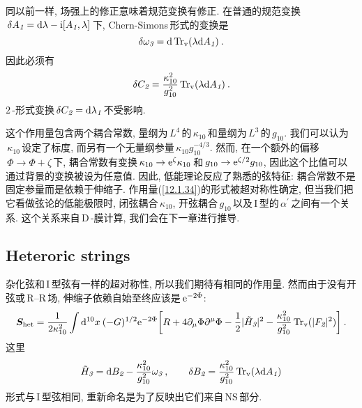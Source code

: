 同以前一样, 场强上的修正意味着规范变换有修正. 在普通的规范变换$\,\delta A_{\textit{1}}=\mathrm{d}\lambda-\mathrm{i}[A_{\textit{1}},\lambda]\,$下, Chern-Simons\,形式的变换是
\begin{equation}
    \delta \omega_{\textit{3}} =\mathrm{d} \operatorname{Tr}_{\mathrm{v}} (\lambda\mathrm{d} A_{\textit{1}}) \:. \label{12.1.37}
\end{equation}
因此必须有
\begin{equation}
    \delta C_{\textit{2}} = \frac{\kappa_{10}^{2}}{g_{10}^{2}} \operatorname{Tr}_{\mathrm{v}}(\lambda\mathrm{d} A_{\textit{1}}) \:. \label{12.1.38}
\end{equation}
$2\,$-形式变换$\,\delta C_{\textit{2}}=\mathrm{d}\lambda_{\textit{1}}\,$不受影响.

这个作用量包含两个耦合常数, 量纲为$\,L^{4}\,$的$\,\kappa_{10}\,$和量纲为$\,L^{3}\,$的$\,g_{10}$. 我们可以认为$\,\kappa_{10}\,$设定了标度, 而另有一个无量纲参量$\,\kappa_{10}g_{10}^{-4/3}$. 然而, 在一个额外的偏移$\,\Phi\to\Phi+\zeta\,$下, 耦合常数有变换$\,\kappa_{10}\to \mathrm{e}^{\zeta}\kappa_{10}\,$和$\,g_{10}\to \mathrm{e}^{\zeta/2}g_{10}$, 因此这个比值可以通过背景的变换被设为任意值. 因此, 低能理论反应了熟悉的弦特征: 耦合常数不是固定参量而是依赖于伸缩子. 作用量(\ref{12.1.34})的形式被超对称性确定, 但当我们把它看做弦论的低能极限时, 闭弦耦合$\,\kappa_{10}$, 开弦耦合$\,g_{10}\,$以及\,I\,型的$\,\alpha^{\prime}\,$之间有一个关系. 这个关系来自\,D\,-膜计算, 我们会在下一章进行推导. 

\subsection*{Heteroric strings}

杂化弦和\,I\,型弦有一样的超对称性, 所以我们期待有相同的作用量. 然而由于没有开弦或\,R--R\,场, 伸缩子依赖自始至终应该是$\,\mathrm{e}^{-2\Phi}$:
\begin{equation}
    \bm{S}_{\text{het}} = \frac{1}{2\kappa_{10}^{2}}\int\mathrm{d}^{10}x\:
    (-G)^{1/2}\mathrm{e}^{-2\Phi}\biggl[ R+ 4\partial_{\mu}\Phi\partial^{\mu}\Phi-\frac{1}{2}\lvert \tilde{H}_{\textit{3}}\rvert^{2}
    -\frac{\kappa_{10}^{2}}{g_{10}^{2}}\operatorname{Tr}_{\mathrm{v}}(\lvert F_{\textit{2}}\rvert^{2})\biggr] \:. \label{12.1.39}
\end{equation}
这里
\begin{equation}
    \tilde{H}_{\textit{3}}=\mathrm{d} B_{\textit{2}} - \frac{\kappa_{10}^{2}}{g_{10}^{2}}\omega_{\textit{3}}  \:, \qquad
        \delta B_{\textit{2}} = \frac{\kappa_{10}^{2}}{g_{10}^{2}}\operatorname{Tr}_{\mathrm{v}}(\lambda\mathrm{d} A_{\textit{1}})\label{12.1.40}
\end{equation}
形式与\,I\,型弦相同, 重新命名是为了反映出它们来自\,NS\,部分.

